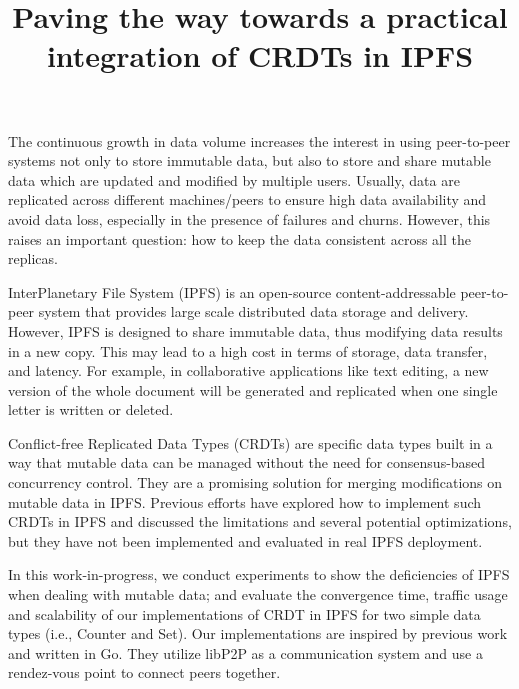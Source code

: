 \documentclass{article}
\title{Paving the way towards a practical integration of CRDTs in IPFS}
\author{
}
\begin{document}
\maketitle

The continuous growth in data volume increases the interest in using peer-to-peer systems 
not only to store immutable data, but also to store and share mutable data which are 
updated and modified by multiple users. Usually, data are replicated across different 
machines/peers to ensure high data availability and avoid data loss, especially in the 
presence of failures and churns. However, this raises an important question: how to keep 
the data consistent across all the replicas.

InterPlanetary File System (IPFS) is an open-source content-addressable peer-to-peer system 
that provides large scale distributed data storage and delivery. However, IPFS is designed 
to share immutable data, thus modifying data results in a new copy. This may lead to a high 
cost in terms of storage, data transfer, and latency. 
For example, in collaborative applications like text editing, a new version of the whole 
document will be generated and replicated when one single letter is  written or deleted. 

Conflict-free Replicated Data Types (CRDTs) are specific data types built in a way that 
mutable data can be managed without the need for consensus-based concurrency control. 
They are a promising solution for merging modifications on mutable data in IPFS. 
Previous efforts have explored how to implement such CRDTs in IPFS and discussed the 
limitations and several potential optimizations, but they have not been implemented and 
evaluated in real IPFS deployment. 

In this work-in-progress, we conduct experiments to show the deficiencies of IPFS when 
dealing with mutable data; and evaluate the convergence time, traffic usage and scalability
of our implementations of CRDT in IPFS for two simple data types (i.e., Counter and Set).
Our implementations are inspired by previous work and written in Go. They utilize libP2P as 
a communication system and use a rendez-vous point to connect peers together. 
\end{document}
